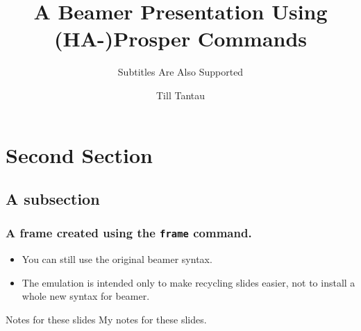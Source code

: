 \documentclass{beamer}
\title{A Beamer Presentation Using (HA-)Prosper Commands}
\subtitle{Subtitles Are Also Supported}
\author{Till Tantau}
\begin{document}
\maketitle




\section{Second Section}

\subsection{A subsection}

\begin{frame}
  \frametitle{A frame created using the \texttt{frame} command.}

  \begin{itemize}[<+->]
  \item You can still use the original beamer syntax.
  \item The emulation is intended only to make recycling slides
    easier, not to install a whole new syntax for beamer.
  \end{itemize}
\end{frame}

\begin{notes}{Notes for these slides}
My notes for these slides.
\end{notes}
\end{document}
